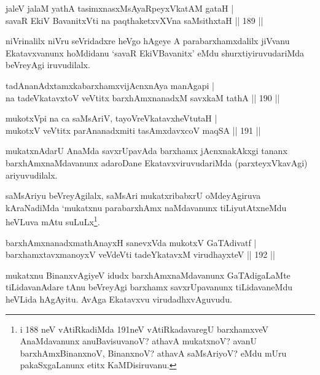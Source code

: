 \begin{shl}
jaleV jalaM yathA tasimxnasxMsAyaRpeyxVkatAM gataH |\\
savaR EkiV BavanitxVti na paqthaketxvXVna saMsithxtaH \hfill || 189 ||
\end{shl}

\begin{artha}
niVrinalilx niVru seVridadxre heVgo hAgeye A parabarxhamxdalilx jiVvanu Ekatavxvanunx hoMdidanu `savaR EkiVBavanitx' eMdu shurxtiyiruvudariMda beVreyAgi iruvudilalx.
\end{artha}


\begin{shl}
tadAnanAdxtamxkabarxhamxvijAcnxnAya manAgapi |\\
na tadeVkatavxtoV veVtitx barxhAmx\s \s nanadxM savxkaM tathA \hfill || 190 ||
\end{shl}

\begin{shl}
mukotxV\s pi na ca saMsAriV, tayoVreVkatavxheVtutaH |\\
mukotxV veVtitx parAnanadxmiti tasAmxdavxcoV maqSA \hfill || 191 ||
\end{shl}

\begin{artha}
mukatxnAdarU AnaMda savxrUpavAda barxhamx jAcnxnakAkxgi tananx barxhAmxnaMdavanunx adaroDane EkatavxviruvudariMda (parxteyxVkavAgi) ariyuvudilalx.

saMsAriyu beVreyAgilalx, saMsAri mukatxribabxrU oMdeyAgiruva kAraNadiMda `mukatxnu parabarxhAmx naMdavanunx tiLiyutAtxneMdu heVLuva mAtu suLuLx\footnote[1]{i 188 neV vAtiRkadiMda 191neV vAtiRkadavaregU barxhamxveV AnaMdavanunx anuBavisuvanoV? athavA mukatxnoV? avanU barxhAmxBinanxnoV, BinanxnoV? athavA saMsAriyoV? eMdu mUru pakaSxgaLanunx etitx KaMDisiruvanu.}.
\end{artha}

\begin{shl}
barxhAmxnanadxmathAnayxH sanevxVda mukotxV GaTAdivatf |\\
barxhamxtavxmanoyxV veVdeVti tadeYkatavxM virudhayxteV \hfill || 192 ||
\end{shl}

\begin{artha}%
mukatxnu BinanxvAgiyeV idudx barxhAmxnaMdavanunx GaTAdigaLaMte tiLidavanAdare tAnu beVreyAgi barxhamx savxrUpavanunx tiLidavaneMdu heVLida hAgAyitu. AvAga Ekatavxvu virudadhxvAguvudu.
\end{artha}

